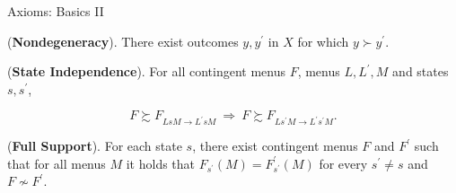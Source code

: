 \documentclass[usenames,dvipsnames,aspectratio=169,11pt, envcountsect, handout]{beamer}
\begin{document}
\begin{frame}{Axioms: Basics II}\label{axiomsb2}

	\begin{axiom}\label{ax:degeneracyapp}

		(\textbf{Nondegeneracy}). There exist outcomes \(y, y^{\prime}\) in \(X\) for which \(y \succ y^{\prime}\).

	\end{axiom}

	\vfill

	\begin{axiom}\label{ax:sindependenceapp}

		(\textbf{\textbf{State Independence}}). For all contingent menus \( F \), menus \( L, L^{\prime}, M \) and states \( s, s^{\prime} \),

		\[
			F \succsim F_{L s M \rightarrow L^{\prime} s M} \: \Rightarrow \: F \succsim F_{L s^{\prime} M \rightarrow L^{\prime} s^{\prime} M} .
		\]

	\end{axiom}


	\vfill

	\begin{axiom}\label{ax:appsupport}

		(\textbf{\textbf{Full Support}}). For each state \(s\), there exist contingent menus \(F \) and \(F^{\prime}\) such that for all menus \( M \) it holds that \(F_{s^{\prime}} \left( M \right) =F^{\prime}_{s^{\prime}} \left( M \right)\) for every \(s^{\prime} \neq s \) and \(F \nsim F^{\prime}\).

	\end{axiom}

	\begin{flushright}
		\hyperlink{axiomsb1main}{}
	\end{flushright}
\end{frame}
\end{document}
